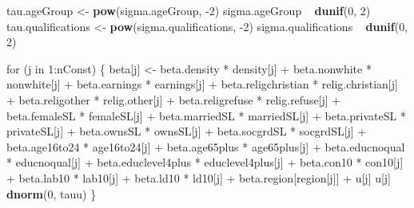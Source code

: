 \documentclass[12pt,twoside]{article}
\newenvironment{Shaded}{}{}
\newcommand{\KeywordTok}[1]{\textcolor[rgb]{0.00,0.44,0.13}{\textbf{{#1}}}}
\newcommand{\DecValTok}[1]{\textcolor[rgb]{0.25,0.63,0.44}{{#1}}}
\newcommand{\StringTok}[1]{\textcolor[rgb]{0.25,0.44,0.63}{{#1}}}
\newcommand{\NormalTok}[1]{{#1}}
\begin{document}
\begin{Shaded}
\begin{Highlighting}[]
    \NormalTok{tau.ageGroup  <-}\StringTok{ }\KeywordTok{pow}\NormalTok{(sigma.ageGroup, -}\DecValTok{2}\NormalTok{)}
    \NormalTok{sigma.ageGroup ~}\StringTok{ }\KeywordTok{dunif}\NormalTok{(}\DecValTok{0}\NormalTok{, }\DecValTok{2}\NormalTok{)}
    \NormalTok{tau.qualifications  <-}\StringTok{ }\KeywordTok{pow}\NormalTok{(sigma.qualifications, -}\DecValTok{2}\NormalTok{)}
    \NormalTok{sigma.qualifications ~}\StringTok{ }\KeywordTok{dunif}\NormalTok{(}\DecValTok{0}\NormalTok{, }\DecValTok{2}\NormalTok{)}

    \NormalTok{for (j in }\DecValTok{1}\NormalTok{:nConst) \{}
        \NormalTok{beta[j] <-}\StringTok{ }\NormalTok{beta.density *}\StringTok{ }\NormalTok{density[j]  +}\StringTok{ }
\StringTok{                    }\NormalTok{beta.nonwhite *}\StringTok{ }\NormalTok{nonwhite[j]  +}
\StringTok{                    }\NormalTok{beta.earnings *}\StringTok{ }\NormalTok{earnings[j] +}\StringTok{ }
\StringTok{                    }\NormalTok{beta.religchristian *}\StringTok{ }\NormalTok{relig.christian[j] +}
\StringTok{                    }\NormalTok{beta.religother *}\StringTok{ }\NormalTok{relig.other[j] +}
\StringTok{                    }\NormalTok{beta.religrefuse *}\StringTok{ }\NormalTok{relig.refuse[j] +}
\StringTok{                    }\NormalTok{beta.femaleSL *}\StringTok{ }\NormalTok{femaleSL[j] +}
\StringTok{                    }\NormalTok{beta.marriedSL *}\StringTok{ }\NormalTok{marriedSL[j] +}
\StringTok{                    }\NormalTok{beta.privateSL *}\StringTok{ }\NormalTok{privateSL[j] +}
\StringTok{                    }\NormalTok{beta.ownsSL *}\StringTok{ }\NormalTok{ownsSL[j] +}
\StringTok{                    }\NormalTok{beta.socgrdSL *}\StringTok{ }\NormalTok{socgrdSL[j] +}
\StringTok{                    }\NormalTok{beta.age16to24 *}\StringTok{ }\NormalTok{age16to24[j] +}\StringTok{ }\NormalTok{beta.age65plus *}\StringTok{ }\NormalTok{age65plus[j] +}\StringTok{                     }
\StringTok{                    }\NormalTok{beta.educnoqual *}\StringTok{ }\NormalTok{educnoqual[j] +}\StringTok{ }
\StringTok{                    }\NormalTok{beta.educlevel4plus *}\StringTok{ }\NormalTok{educlevel4plus[j] +}
\StringTok{                    }\NormalTok{beta.con10 *}\StringTok{ }\NormalTok{con10[j] +}\StringTok{ }
\StringTok{                    }\NormalTok{beta.lab10 *}\StringTok{ }\NormalTok{lab10[j] +}\StringTok{ }
\StringTok{                    }\NormalTok{beta.ld10 *}\StringTok{ }\NormalTok{ld10[j] +}
\StringTok{                    }\NormalTok{beta.region[region[j]] +}\StringTok{ }
\StringTok{                    }\NormalTok{u[j]}
        \NormalTok{u[j] ~}\StringTok{ }\KeywordTok{dnorm}\NormalTok{(}\DecValTok{0}\NormalTok{, tauu)}
    \NormalTok{\}}


\end{Highlighting}
\end{Shaded}
\end{document}
